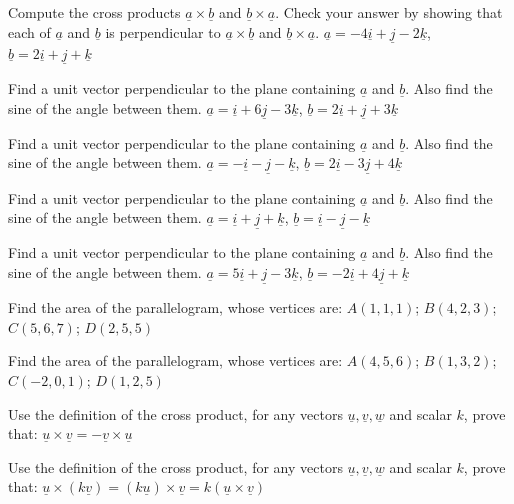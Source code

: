 \documentclass[11pt,a4paper]{article}
\begin{document}
\begin{longlist}
\item Compute the cross products $\underline{a}\times\underline{b}$ and $\underline{b}\times\underline{a}$. Check your answer by showing that each of $\underline{a}$ and $\underline{b}$ is perpendicular to $\underline{a}\times\underline{b}$ and $\underline{b}\times\underline{a}$. $\underline{a}=-4\underline{i}+\underline{j}-2\underline{k}$, $\underline{b}=2\underline{i}+\underline{j}+\underline{k}$

\item Find a unit vector perpendicular to the plane containing $\underline{a}$ and $\underline{b}$. Also find the sine of the angle between them. $\underline{a}=\underline{i}+6\underline{j}-3\underline{k}$, $\underline{b}=2\underline{i}+\underline{j}+3\underline{k}$

\item Find a unit vector perpendicular to the plane containing $\underline{a}$ and $\underline{b}$. Also find the sine of the angle between them. $\underline{a}=-\underline{i}-\underline{j}-\underline{k}$, $\underline{b}=2\underline{i}-3\underline{j}+4\underline{k}$

\item Find a unit vector perpendicular to the plane containing $\underline{a}$ and $\underline{b}$. Also find the sine of the angle between them. $\underline{a}=\underline{i}+\underline{j}+\underline{k}$, $\underline{b}=\underline{i}-\underline{j}-\underline{k}$

\item Find a unit vector perpendicular to the plane containing $\underline{a}$ and $\underline{b}$. Also find the sine of the angle between them. $\underline{a}=5\underline{i}+\underline{j}-3\underline{k}$, $\underline{b}=-2\underline{i}+4\underline{j}+\underline{k}$

\item Find the area of the parallelogram, whose vertices are: $A(1,1,1)$; $B(4,2,3)$; $C(5,6,7)$; $D(2,5,5)$

\item Find the area of the parallelogram, whose vertices are: $A(4,5,6)$; $B(1,3,2)$; $C(-2,0,1)$; $D(1,2,5)$

\item Use the definition of the cross product, for any vectors $\underline{u},\underline{v},\underline{w}$ and scalar $k$, prove that: $\underline{u}\times\underline{v}= -\underline{v}\times\underline{u}$

\item Use the definition of the cross product, for any vectors $\underline{u},\underline{v},\underline{w}$ and scalar $k$, prove that: $\underline{u}\times(k\underline{v})=(k\underline{u})\times\underline{v}=k(\underline{u}\times\underline{v})$


\end{longlist}
\end{document}
